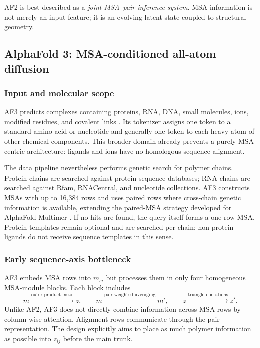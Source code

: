\documentclass[10pt]{article}
\begin{document}
AF2 is best described as a \emph{joint MSA--pair inference system}.  MSA information is not merely
an input feature; it is an evolving latent state coupled to structural geometry.

\subsection{AlphaFold 3: MSA-conditioned all-atom diffusion}

\subsubsection{Input and molecular scope}

AF3 predicts complexes containing proteins, RNA, DNA, small molecules, ions, modified residues,
and covalent links \cite{abramson2024}.  Its tokenizer assigns one token to a standard amino acid
or nucleotide and generally one token to each heavy atom of other chemical components.  This
broader domain already prevents a purely MSA-centric architecture: ligands and ions have no
homologous-sequence alignment.

The data pipeline nevertheless performs genetic search for polymer chains.  Protein chains are
searched against protein sequence databases; RNA chains are searched against Rfam, RNACentral,
and nucleotide collections.  AF3 constructs MSAs with up to 16,384 rows and uses paired rows where
cross-chain genetic information is available, extending the paired-MSA strategy developed for
AlphaFold-Multimer \cite{evans2022}.  If no hits are found, the query itself forms a
one-row MSA.  Protein templates remain optional and are searched per chain; non-protein ligands do
not receive sequence templates in this sense.

\subsubsection{Early sequence-axis bottleneck}

AF3 embeds MSA rows into $m_{si}$ but processes them in only four homogeneous MSA-module blocks.
Each block includes
\begin{equation}
m
\xrightarrow{\text{outer-product mean}}z,
\qquad
m\xrightarrow{\text{pair-weighted averaging}}m',
\qquad
z\xrightarrow{\text{triangle operations}}z'.
\label{eq:af3-msa-module}
\end{equation}
Unlike AF2, AF3 does not directly combine information across MSA rows by column-wise attention.
Alignment rows communicate through the pair representation.  The design explicitly aims to place
as much polymer information as possible into $z_{ij}$ before the main trunk.
\end{document}
